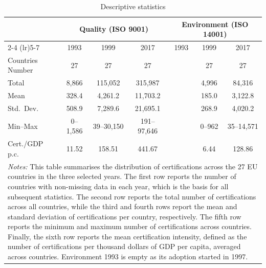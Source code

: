\begin{table}[H]\centering
\caption{Descriptive statistics}
\label{tab:desc_stats}
\begin{tabular}{lcccccc}\hline\hline
& \multicolumn{3}{c}{Quality (ISO 9001)} & \multicolumn{3}{c}{Environment (ISO 14001)} \\
\cmidrule(lr){2-4} \cmidrule(lr){5-7}
& 1993 & 1999 & 2017 & 1993 & 1999 & 2017 \\\hline
Countries Number & 27 & 27 & 27 & & 27 & 27 \\
Total & 8,866 & 115,052 & 315,987 & & 4,996 & 84,316 \\
Mean & 328.4 & 4,261.2 & 11,703.2 & & 185.0 & 3,122.8 \\
Std.\ Dev. & 508.9 & 7,289.6 & 21,695.1 & & 268.9 & 4,020.2 \\
Min--Max & 0--1,586 & 39--30,150 & 191--97,646 & & 0--962 & 35--14,571 \\
Cert./GDP p.c. & 11.52 & 158.51 & 441.67 & & 6.44 & 128.86 \\
\hline\hline
\multicolumn{7}{p{0.92\textwidth}}{\footnotesize \textit{Notes:} This table summarises the distribution of certifications across the 27 EU countries in the three selected years. The first row reports the number of countries with non-missing data in each year, which is the basis for all subsequent statistics. The second row reports the total number of certifications across all countries, while the third and fourth rows report the mean and standard deviation of certifications per country, respectively. The fifth row reports the minimum and maximum number of certifications across countries. Finally, the sixth row reports the mean certification intensity, defined as the number of certifications per thousand dollars of GDP per capita, averaged across countries. Environment 1993 is empty as its adoption started in 1997.} \\
\end{tabular}
\end{table}
